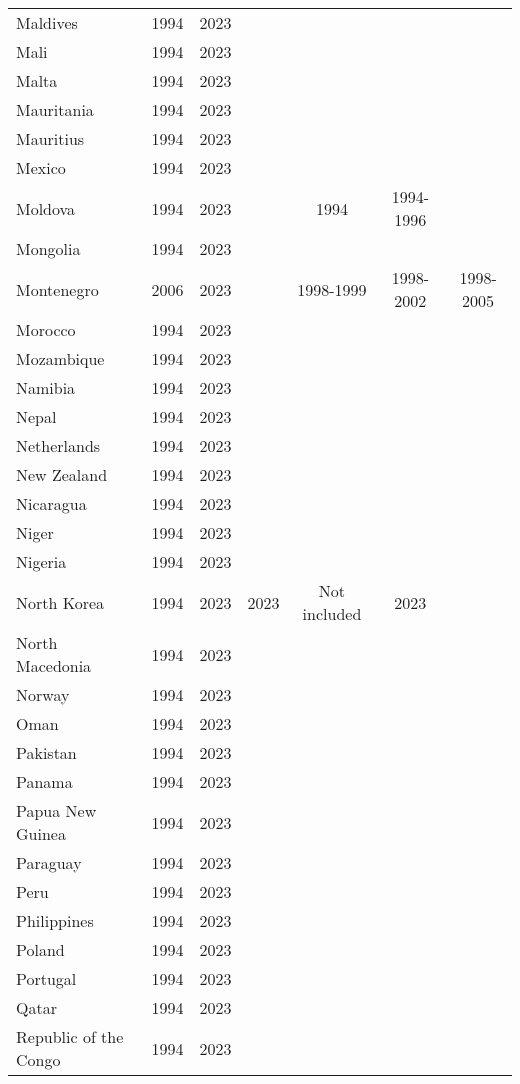 {\begin{longtable}{lcccccc}
Maldives & 1994 & 2023 &  &  &  & \\
\addlinespace
Mali & 1994 & 2023 &  &  &  & \\
Malta & 1994 & 2023 &  &  &  & \\
Mauritania & 1994 & 2023 &  &  &  & \\
Mauritius & 1994 & 2023 &  &  &  & \\
Mexico & 1994 & 2023 &  &  &  & \\
\addlinespace
Moldova & 1994 & 2023 &  & 1994 & 1994-1996 & \\
Mongolia & 1994 & 2023 &  &  &  & \\
Montenegro & 2006 & 2023 &  & 1998-1999 & 1998-2002 & 1998-2005\\
Morocco & 1994 & 2023 &  &  &  & \\
Mozambique & 1994 & 2023 &  &  &  & \\
\addlinespace
Namibia & 1994 & 2023 &  &  &  & \\
Nepal & 1994 & 2023 &  &  &  & \\
Netherlands & 1994 & 2023 &  &  &  & \\
New Zealand & 1994 & 2023 &  &  &  & \\
Nicaragua & 1994 & 2023 &  &  &  & \\
\addlinespace
Niger & 1994 & 2023 &  &  &  & \\
Nigeria & 1994 & 2023 &  &  &  & \\
North Korea & 1994 & 2023 & 2023 & Not included & 2023 & \\
North Macedonia & 1994 & 2023 &  &  &  & \\
Norway & 1994 & 2023 &  &  &  & \\
\addlinespace
Oman & 1994 & 2023 &  &  &  & \\
Pakistan & 1994 & 2023 &  &  &  & \\
Panama & 1994 & 2023 &  &  &  & \\
Papua New Guinea & 1994 & 2023 &  &  &  & \\
Paraguay & 1994 & 2023 &  &  &  & \\
\addlinespace
Peru & 1994 & 2023 &  &  &  & \\
Philippines & 1994 & 2023 &  &  &  & \\
Poland & 1994 & 2023 &  &  &  & \\
Portugal & 1994 & 2023 &  &  &  & \\
Qatar & 1994 & 2023 &  &  &  & \\
\addlinespace
Republic of the Congo & 1994 & 2023 &  &  &  & \\

\end{longtable}}
